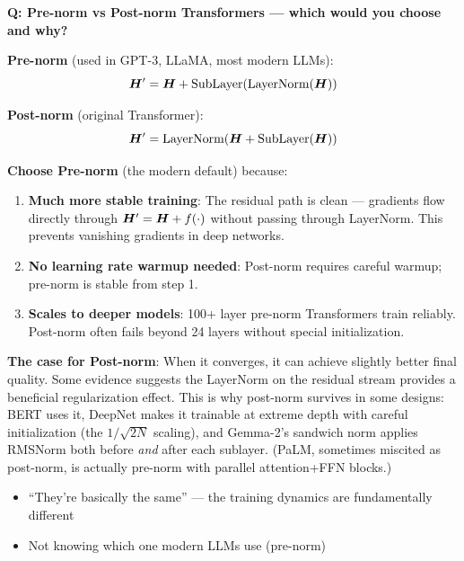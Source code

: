 \begin{interviewq}
\textbf{Q: Pre-norm vs Post-norm Transformers --- which would you choose and why?}

 \quad {} \quad \badgefreq{\freqmed}

\stronganswer

\textbf{Pre-norm} (used in GPT-3, LLaMA, most modern LLMs):
\[\bm{H}' = \bm{H} + \text{SubLayer}(\text{LayerNorm}(\bm{H}))\]

\textbf{Post-norm} (original Transformer):
\[\bm{H}' = \text{LayerNorm}(\bm{H} + \text{SubLayer}(\bm{H}))\]

\textbf{Choose Pre-norm} (the modern default) because:
\begin{enumerate}
    \item \textbf{Much more stable training}: The residual path is clean --- gradients flow directly through $\bm{H}' = \bm{H} + f(\cdot)$ without passing through LayerNorm. This prevents vanishing gradients in deep networks.
    \item \textbf{No learning rate warmup needed}: Post-norm requires careful warmup; pre-norm is stable from step 1.
    \item \textbf{Scales to deeper models}: 100+ layer pre-norm Transformers train reliably. Post-norm often fails beyond 24 layers without special initialization.
\end{enumerate}

\textbf{The case for Post-norm}: When it converges, it can achieve slightly better final quality. Some evidence suggests the LayerNorm on the residual stream provides a beneficial regularization effect. This is why post-norm survives in some designs: BERT uses it, DeepNet makes it trainable at extreme depth with careful initialization (the $1/\sqrt{2N}$ scaling), and Gemma-2's sandwich norm applies RMSNorm both before \textit{and} after each sublayer. (PaLM, sometimes miscited as post-norm, is actually pre-norm with parallel attention+FFN blocks.)

\redflags
\begin{itemize}
    \item ``They're basically the same'' --- the training dynamics are fundamentally different
    \item Not knowing which one modern LLMs use (pre-norm)
\end{itemize}



\end{interviewq}
